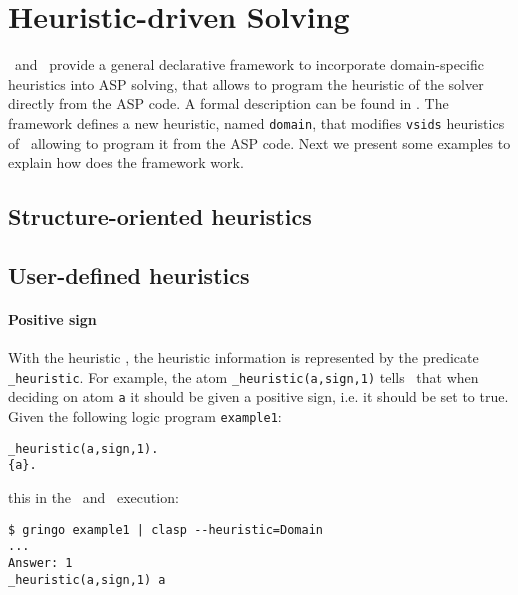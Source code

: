 

\section{Heuristic-driven Solving}
\label{sec:heuristic}


%
%
%


\clasp\ and \clingo\ provide a general declarative framework to incorporate domain-specific heuristics into ASP solving,  
that allows to program the heuristic of the solver directly from the ASP code.
A formal description can be found in \cite{gekaotroscwa13a}.
The framework defines a new heuristic, named \texttt{domain},
that modifies \texttt{vsids} heuristics of \clasp\ allowing to program it from the ASP code.
Next we present some examples to explain how does the framework work.

\subsection{Structure-oriented heuristics}
\tbf
\subsection{User-defined heuristics}

\paragraph{Positive sign}

With the heuristic , the heuristic information is represented by the predicate \texttt{\_heuristic}.
For example, the atom \texttt{\_heuristic(a,sign,1)} tells  \clasp\ that  when deciding on atom \texttt{a}
it should be given a positive sign, i.e. it should be set to true.
Given the following logic program \texttt{example1}:
\begin{lstlisting}[numbers=none]
_heuristic(a,sign,1).
{a}.
\end{lstlisting}
this in the \gringo\ and \clasp\ execution:
\begin{lstlisting}[numbers=none]
$ gringo example1 | clasp --heuristic=Domain
...
Answer: 1
_heuristic(a,sign,1) a
\end{lstlisting}

